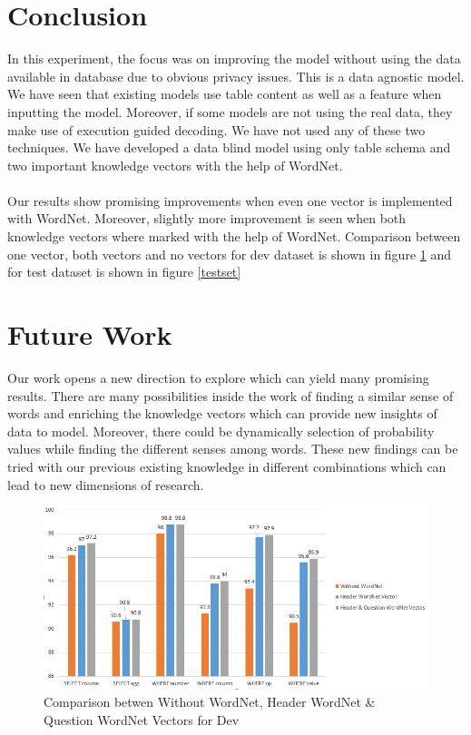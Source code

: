 \documentclass[12pt]{article}
\begin{document}
\section{Conclusion}
In this experiment, the focus was on improving the model without using the data available in database due to obvious privacy issues. This is a data agnostic model. We have seen that existing models use table content as well as a feature when inputting the model. Moreover, if some models are not using the real data, they make use of execution guided decoding. We have not used any of these two techniques. We have developed a data blind model using only table schema and two important knowledge vectors with the help of WordNet. 
\\
\\
Our results show promising improvements when even one vector is implemented with WordNet. Moreover, slightly more improvement is seen when both knowledge vectors where marked with the help of WordNet. Comparison between one vector, both vectors and no vectors for dev dataset is shown in figure \ref{devset} and for test dataset is shown in figure \ref{testset}


\section{Future Work}
Our work opens a new direction to explore which can yield many promising results. There are many possibilities inside the work of finding a similar sense of words and enriching the knowledge vectors which can provide new insights of data to model. Moreover, there could be dynamically selection of probability values while finding the different senses among words. These new findings can be tried with our previous existing knowledge in different combinations which can lead to new dimensions of research. 



\begin{figure}[H]
    \includegraphics[width=400pt]{devset}
    \caption{Comparison betwen Without WordNet, Header WordNet \&  Question WordNet Vectors for Dev}
    \label{devset}
\end{figure}
\end{document}
